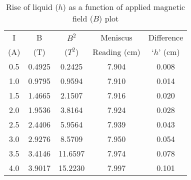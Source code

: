 \begin{table}[H]
    \centering
    \begin{tabular}{|c|c|c|c|c|}
    \hline
     I& B   & $B^2$  & Meniscus & Difference\\ 
    (A)   &    (T)  &  ($T^2$) & Reading (cm) & ‘$h$’ (cm) \\\hline
     0.5 & 0.4925 &  0.2425 & 7.904 & 0.008 \\
     1.0 & 0.9795 &  0.9594 & 7.910 & 0.014 \\
     1.5 & 1.4665 &  2.1507 & 7.916 & 0.020 \\
     2.0 & 1.9536 &  3.8164 & 7.924 & 0.028 \\
     2.5 & 2.4406 &  5.9564 & 7.939 & 0.043 \\
     3.0 & 2.9276 &  8.5709 & 7.950 & 0.054 \\
     3.5 & 3.4146 & 11.6597 & 7.974 & 0.078 \\
     4.0 & 3.9017 & 15.2230 & 7.997 & 0.101 \\
    \hline
    \end{tabular}
    \caption{Rise of liquid ($h$) as a function of applied magnetic field ($B$) plot}
    \label{tab:2}
\end{table}